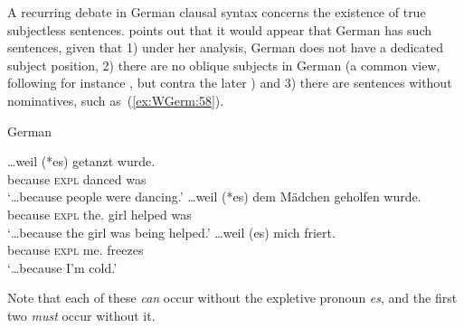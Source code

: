 \documentclass[output=paper,hidelinks]{langscibook}
\begin{document}
A recurring debate in German clausal syntax concerns the existence of
true subjectless sentences. \citet[Chapter~4]{Berman2003} points out
that it would appear that German has such sentences, given that 1)
under her analysis, German does not have a dedicated subject position,
2) there are no oblique subjects in German (a common view, following
for instance \citealp{ZMT85:Case}, but contra the later
\citealp{barthdal05}) and 3) there are sentences without
nominatives, such as~(\ref{ex:WGerm:58}). 
%
\begin{exe}
  \ex\label{ex:WGerm:58} German \citep[§4.2, examples 10a, 16b, 10d{;} indication of optionality of expletive mine]{Berman2003}
  \begin{xlist}
    \ex \gll \ldots{}weil (*es) getanzt wurde.\\
             \phantom{\ldots{}}because \phantom{(*}\textsc{expl} danced was\\
        \glt `\ldots{}because people were dancing.'
    \ex \gll \ldots{}weil (*es) dem Mädchen geholfen wurde.\\
             \phantom{\ldots{}}because \phantom{(*}\textsc{expl} the.\DAT{} girl helped was\\
        \glt `\ldots{}because the girl was being helped.'
    \ex \gll \ldots{}weil (es) mich friert.\\
        \phantom{\ldots{}}because \phantom{(}\textsc{expl} me.\ACC{} freezes\\
        \glt `\ldots{}because I'm cold.'
  \end{xlist}
\end{exe}
%
Note that each of these \textit{can} occur without the expletive pronoun
\textit{es}, and the first two \textit{must} occur without it.
\end{document}
